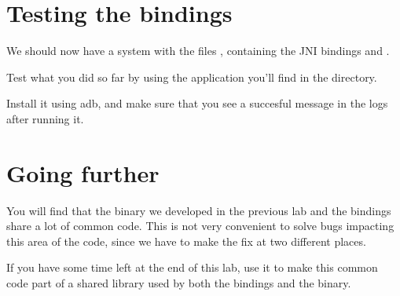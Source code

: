 \section{Testing the bindings}

We should now have a system with the files
, containing the JNI bindings and
.

Test what you did so far by using the  application
you'll find in the  directory.

Install it using adb, and make sure that you see a succesful message
in the logs after running it.

\section{Going further}

You will find that the binary we developed in the previous lab and
the bindings share a lot of common code. This is not very convenient
to solve bugs impacting this area of the code, since we have to make
the fix at two different places.

If you have some time left at the end of this lab, use it to make this
common code part of a shared library used by both the bindings and the
binary.
